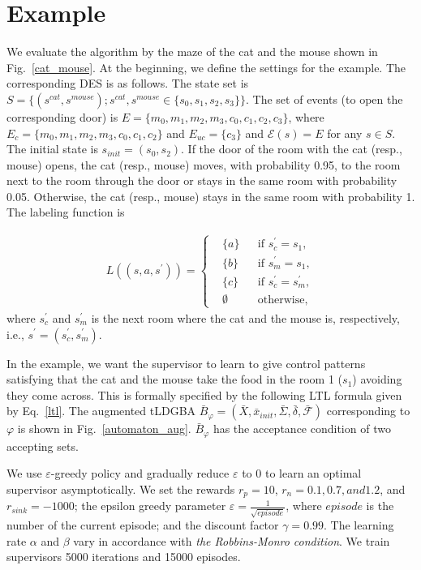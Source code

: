 \section{Example}
We evaluate the algorithm by the maze of the cat and the mouse shown in Fig.\ \ref{cat_mouse}. At the beginning, we define the settings for the example. The corresponding DES is as follows. The state set is $S = \{ (s^{cat}, s^{mouse}) ; s^{cat},s^{mouse} \in \{ s_0,s_1,s_2,s_3 \} \}$. The set of events (to open the corresponding door) is $E = \{ m_0, m_1, m_2, m_3, c_0, c_1, c_2, c_3 \}$, where $E_{c} = \{ m_0, m_1, m_2, m_3, c_0, c_1, c_2 \}$ and $E_{uc} = \{ c_3 \}$ and $\mathcal{E}(s) = E$ for any $s \in S$. The initial state is $s_{init} = (s_0, s_2)$. If the door of the room with the cat (resp., mouse) opens, the cat (resp., mouse) moves, with probability 0.95, to the room next to the room through the door or stays in the same room with probability 0.05. Otherwise, the cat (resp., mouse) stays in the same room with probability 1. The labeling function is

\begin{align}
   L((s, a, s^{\prime})) =
    \left\{
    \begin{aligned}
      & \{ a \} &  & \text{if }s_c^{\prime} = s_1, \nonumber \\
      & \{ b \} &  & \text{if }s_m^{\prime} = s_1, \nonumber \\
      & \{ c \} &  & \text{if }s_c^{\prime} = s_m^{\prime}, \nonumber \\
      & \emptyset &  & \text{otherwise},
    \end{aligned}
    \right.
\end{align}
where $s_c^{\prime}$ and $s_m^{\prime}$ is the next room where the cat and the mouse is, respectively, i.e., $s^{\prime} = (s_c^{\prime},s_m^{\prime})$.

In the example, we want the supervisor to learn to give control patterns satisfying that the cat and the mouse take the food in the room 1 ($s_1$) avoiding they come across. This is formally specified by the following LTL formula given by Eq.\ \ref{ltl}.
The augmented tLDGBA $\bar{B}_{\varphi} = (\bar{X},\bar{x}_{init},\bar{\Sigma},\bar{\delta},\bar{\mathcal{F}})$ corresponding to $\varphi$ is shown in Fig.\ \ref{automaton_aug}. $\bar{B}_{\varphi}$ has the acceptance condition of two accepting sets.

We use $\varepsilon$-greedy policy and gradually reduce $\varepsilon$ to 0 to learn an optimal supervisor asymptotically.
We set the rewards $r_p = 10$, $r_{n} = 0.1, 0.7, and 1.2$, and $r_{sink} = -1000$; the epsilon greedy parameter $ \varepsilon = \frac{1}{ \sqrt{episode} }$, where $episode$ is the number of the current episode; and the discount factor $\gamma = 0.99$. %
The learning rate $\alpha$ and $\beta$ vary in accordance with {\it the Robbins-Monro condition}. We train supervisors 5000 iterations and 15000 episodes.

